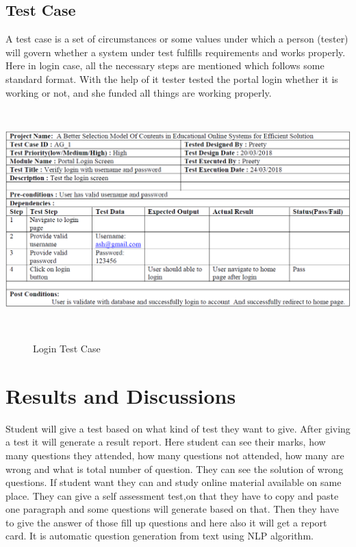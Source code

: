 \section{Test Case}
A test case is a set of circumstances or some values under which a person (tester) will govern whether a system under test fulfills requirements and works properly. Here in login case, all the necessary steps are mentioned which follows some standard format. With the help of it tester tested the portal login whether it is working or not, and she funded all things are working properly. \\[0.5cm]
\begin{center}
	\includegraphics[width=13.6cm, height=8.5cm]{test-Case.png}
	\begin{figure}[h!]
		\centering
		\caption{Login Test Case}%
	\end{figure}
\end{center}
\chapter{Results and Discussions}

Student will give a test based on what kind of test they want to give. After giving a test it will generate a result report. Here student can see their marks, how many questions they attended, how many questions not attended, how many are wrong and what is total number of question. They can see the solution of wrong questions. If student want they can and study online material available on same place. They can give a self assessment test,on that they have to copy and paste one paragraph and some questions will generate based on that. Then they have to give the answer of those fill up questions and here also it will get a report card. It is automatic question generation from text using NLP algorithm.\\


